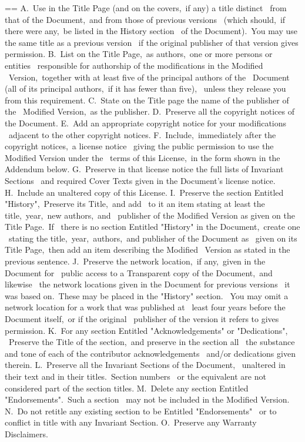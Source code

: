 \documentclass{book}
\makeatletter
\newenvironment{Texinfopreformatted}{%
  \par\GNUTobeylines\obeyspaces\frenchspacing\parskip=\z@\parindent=\z@}{}
{\catcode`\^^M=13 \gdef\GNUTobeylines{\catcode`\^^M=13 \def^^M{\null\par}}}
\newenvironment{Texinfoindented}{\begin{list}{}{}\item\relax}{\end{list}}
\renewcommand{\_}{\Texinfounderscore\discretionary{}{}{}}
\makeatother
\begin{document}
\begin{Texinfoindented}
\begin{Texinfopreformatted}
A.\ Use in the Title Page (and on the covers,\ if any) a title distinct
\   from that of the Document,\ and from those of previous versions
\   (which should,\ if there were any,\ be listed in the History section
\   of the Document).\  You may use the same title as a previous version
\   if the original publisher of that version gives permission.
B.\ List on the Title Page,\ as authors,\ one or more persons or entities
\   responsible for authorship of the modifications in the Modified
\   Version,\ together with at least five of the principal authors of the
\   Document (all of its principal authors,\ if it has fewer than five),
\   unless they release you from this requirement.
C.\ State on the Title page the name of the publisher of the
\   Modified Version,\ as the publisher.
D.\ Preserve all the copyright notices of the Document.
E.\ Add an appropriate copyright notice for your modifications
\   adjacent to the other copyright notices.
F.\ Include,\ immediately after the copyright notices,\ a license notice
\   giving the public permission to use the Modified Version under the
\   terms of this License,\ in the form shown in the Addendum below.
G.\ Preserve in that license notice the full lists of Invariant Sections
\   and required Cover Texts given in the Document's license notice.
H.\ Include an unaltered copy of this License.
I.\ Preserve the section Entitled "History",\ Preserve its Title,\ and add
\   to it an item stating at least the title,\ year,\ new authors,\ and
\   publisher of the Modified Version as given on the Title Page.\  If
\   there is no section Entitled "History" in the Document,\ create one
\   stating the title,\ year,\ authors,\ and publisher of the Document as
\   given on its Title Page,\ then add an item describing the Modified
\   Version as stated in the previous sentence.
J.\ Preserve the network location,\ if any,\ given in the Document for
\   public access to a Transparent copy of the Document,\ and likewise
\   the network locations given in the Document for previous versions
\   it was based on.\  These may be placed in the "History" section.
\   You may omit a network location for a work that was published at
\   least four years before the Document itself,\ or if the original
\   publisher of the version it refers to gives permission.
K.\ For any section Entitled "Acknowledgements" or "Dedications",
\   Preserve the Title of the section,\ and preserve in the section all
\   the substance and tone of each of the contributor acknowledgements
\   and/or dedications given therein.
L.\ Preserve all the Invariant Sections of the Document,
\   unaltered in their text and in their titles.\  Section numbers
\   or the equivalent are not considered part of the section titles.
M.\ Delete any section Entitled "Endorsements".\  Such a section
\   may not be included in the Modified Version.
N.\ Do not retitle any existing section to be Entitled "Endorsements"
\   or to conflict in title with any Invariant Section.
O.\ Preserve any Warranty Disclaimers.


\end{Texinfopreformatted}
\end{Texinfoindented}
\end{document}
